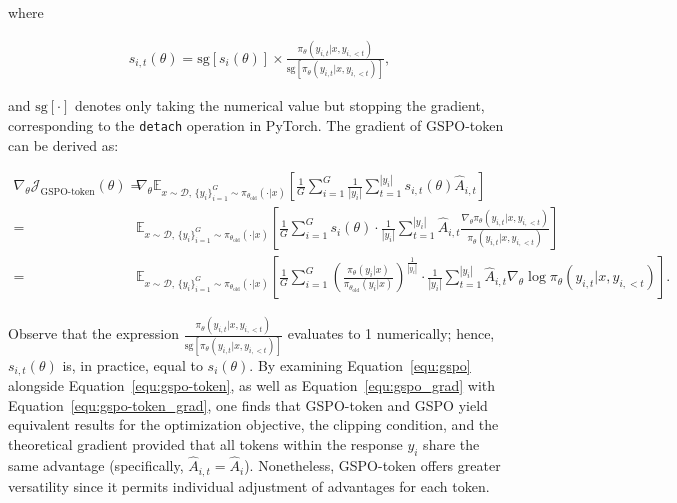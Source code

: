 where

\begin{align}
s_{i,t}(\theta) 
= \mathrm{sg} \left[ s_{i}(\theta) \right]  \times \frac{ \pi_{\theta} (y_{i,t} | x, y_{i,<t}) }{ \mathrm{sg} \left[ \pi_{\theta} (y_{i,t} | x, y_{i,<t}) \right] },
\end{align}

and $\mathrm{sg}[\cdot]$ denotes only taking the numerical value but stopping the gradient, corresponding to the \texttt{detach} operation in PyTorch. The gradient of GSPO-token can be derived as:

\begin{align}
\nabla_{\theta} \mathcal{J}_\text{GSPO-token}(\theta)
=&\
\nabla_{\theta} \mathbb{E}_{ x \sim \mathcal{D},\, \{y_i\}_{i=1}^G \sim \pi_{\theta_\text{old}}( \cdot | x) }
\left[
\frac{1}{G} \sum_{i=1}^{G}
\frac{1}{|y_i|} \sum_{t=1}^{|y_i|}
s_{i,t}(\theta) \widehat{A}_{i,t}
\right] \\
=&\
\mathbb{E}_{ x \sim \mathcal{D},\, \{y_i\}_{i=1}^G \sim \pi_{\theta_\text{old}}( \cdot | x) }
\left[
\frac{1}{G} \sum_{i=1}^{G} s_i (\theta) \cdot \frac{1}{|y_i|} \sum_{t=1}^{|y_i|}
\widehat{A}_{i,t} \frac{ \nabla_{\theta} \pi_{\theta} (y_{i,t} | x, y_{i,<t}) }{ \pi_{\theta} (y_{i,t} | x, y_{i,<t}) }
\right] \\
=&\
\mathbb{E}_{ x \sim \mathcal{D},\, \{y_i\}_{i=1}^G \sim \pi_{\theta_\text{old}}( \cdot | x) }
\left[
\frac{1}{G} \sum_{i=1}^{G}  \left( \frac{ \pi_{\theta} (y_i | x) }{ \pi_{\theta_\text{old}} (y_i | x)} \right)^{\frac{1}{|y_i|}}
\cdot \frac{1}{|y_i|} \sum_{t=1}^{|y_i|}
\widehat{A}_{i,t} \nabla_{\theta} \log \pi_{\theta} (y_{i,t} | x, y_{i,<t})
\right].
\label{equ:gspo-token_grad}
\end{align}

Observe that the expression $\frac{ \pi_{\theta} (y_{i,t} | x, y_{i,<t}) }{ \mathrm{sg} \left[ \pi_{\theta} (y_{i,t} | x, y_{i,<t}) \right] }$ evaluates to 1 numerically; hence, $s_{i,t}(\theta)$ is, in practice, equal to $s_{i}(\theta)$. By examining Equation~\eqref{equ:gspo} alongside Equation~\eqref{equ:gspo-token}, as well as Equation~\eqref{equ:gspo_grad} with Equation~\eqref{equ:gspo-token_grad}, one finds that GSPO-token and GSPO yield equivalent results for the optimization objective, the clipping condition, and the theoretical gradient provided that all tokens within the response $y_i$ share the same advantage (specifically, $\widehat{A}_{i,t} = \widehat{A}_{i}$). Nonetheless, GSPO-token offers greater versatility since it permits individual adjustment of advantages for each token.

